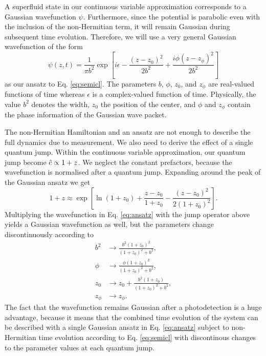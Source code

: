 A superfluid state in our continuous variable approximation
corresponds to a Gaussian wavefunction $\psi$. Furthermore, since the
potential is parabolic even with the inclusion of the non-Hermitian
term, it will remain Gaussian during subsequent time
evolution. Therefore, we will use a very general Gaussian wavefunction
of the form
\begin{equation}
  \label{eq:ansatz}
  \psi(z, t) = \frac{1}{\pi b^2}\exp\left[ i \epsilon 
  - \frac{(z - z_0)^2} {2 b^2} + \frac{i \phi (z - z_\phi)^2} {2 b^2} \right]
\end{equation}
as our ansatz to Eq. \eqref{eq:semicl}. The parameters $b$, $\phi$,
$z_0$, and $z_\phi$ are real-valued functions of time whereas
$\epsilon$ is a complex-valued function of time. Physically, the value
$b^2$ denotes the width, $z_0$ the position of the center, and $\phi$
and $z_\phi$ contain the phase information of the Gaussian wave
packet.

The non-Hermitian Hamiltonian and an ansatz are not enough to describe
the full dynamics due to measurement. We also need to derive the
effect of a single quantum jump. Within the continuous variable
approximation, our quantum jump become $\hat{c} \propto 1 + z$. We neglect
the constant prefactors, because the wavefunction is normalised after
a quantum jump. Expanding around the peak of the Gaussian ansatz we
get
\begin{equation}
  1 + z \approx \exp \left[ \ln (1 + z_0) + \frac{z - z_0}{1 + z_0} -
    \frac{(z - z_0)^2}{2 (1 + z_0)^2} \right].
\end{equation}
Multiplying the wavefunction in Eq. \eqref{eq:ansatz} with the jump
operator above yields a Gaussian wavefunction as well, but the
parameters change discontinuously according to
\begin{align}
  \label{eq:jumpb2}
  b^2 & \rightarrow \frac{ b^2 (1 + z_0)^2 } { (1 + z_0)^2 + b^2 }, \\
  \phi & \rightarrow \frac{ \phi (1 + z_0)^2 } { (1 + z_0)^2 + b^2 }, \\
  \label{eq:jumpz0}
  z_0 & \rightarrow z_0 + \frac{ b^2 (1 + z_0) } { (1 + z_0)^2 + b^2}, \\
  z_\phi & \rightarrow z_\phi.
\end{align}
The fact that the wavefunction remains Gaussian after a photodetection
is a huge advantage, because it means that the combined time evolution
of the system can be described with a single Gaussian ansatz in
Eq. \eqref{eq:ansatz} subject to non-Hermitian time evolution
according to Eq. \eqref{eq:semicl} with discontinous changes to the
parameter values at each quantum jump.

